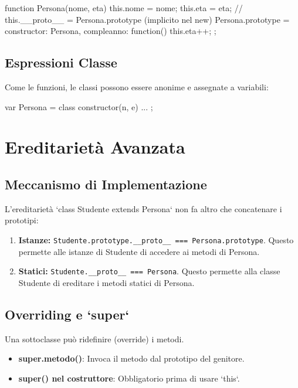 \begin{jsbox}[title={Equivalente ES5 (Pseudocodice)}]
function Persona(nome, eta) {
    this.nome = nome;
    this.eta = eta;
    // this.__proto__ = Persona.prototype (implicito nel new)
}
Persona.prototype = {
    constructor: Persona,
    compleanno: function() { this.eta++; }
};
\end{jsbox}

\subsection{Espressioni Classe}
Come le funzioni, le classi possono essere anonime e assegnate a variabili:
\begin{jsbox}
var Persona = class {
    constructor(n, e) { ... }
};
\end{jsbox}

\section{Ereditarietà Avanzata}

\subsection{Meccanismo di Implementazione}
L'ereditarietà `class Studente extends Persona` non fa altro che concatenare i prototipi:
\begin{enumerate}
    \item \textbf{Istanze:} \texttt{Studente.prototype.\_\_proto\_\_ === Persona.prototype}. Questo permette alle istanze di Studente di accedere ai metodi di Persona.
    \item \textbf{Statici:} \texttt{Studente.\_\_proto\_\_ === Persona}. Questo permette alla classe Studente di ereditare i metodi statici di Persona.
\end{enumerate}

\subsection{Overriding e `super`}
Una sottoclasse può ridefinire (override) i metodi.
\begin{itemize}
    \item \textbf{super.metodo()}: Invoca il metodo dal prototipo del genitore.
    \item \textbf{super() nel costruttore}: Obbligatorio prima di usare `this`.
\end{itemize}

